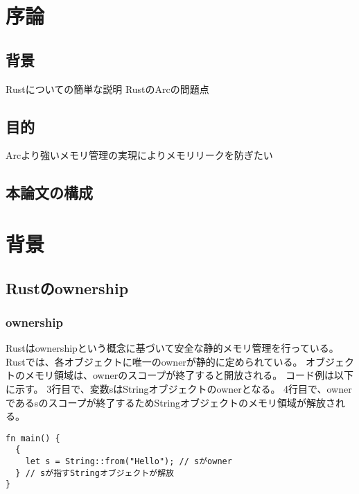\documentclass{sumiilab-paper}
\theoremstyle{mystyle}
\numberwithin{definition}{chapter} %
\begin{document}
\tableofcontents%

\mainmatter%

\chapter{序論}

\section{背景}
Rustについての簡単な説明
RustのArcの問題点

\section{目的}
Arcより強いメモリ管理の実現によりメモリリークを防ぎたい

\section{本論文の構成}


\chapter{背景}

\section{Rustのownership}

\subsection{ownership}
Rustはownershipという概念に基づいて安全な静的メモリ管理を行っている。
Rustでは、各オブジェクトに唯一のownerが静的に定められている。
オブジェクトのメモリ領域は、ownerのスコープが終了すると開放される。
コード例は以下に示す。
3行目で、変数sはStringオブジェクトのownerとなる。
4行目で、ownerであるsのスコープが終了するためStringオブジェクトのメモリ領域が解放される。
\begin{lstlisting}
fn main() {
  {
    let s = String::from("Hello"); // sがowner
  } // sが指すStringオブジェクトが解放
}
\end{lstlisting}
\end{document}
